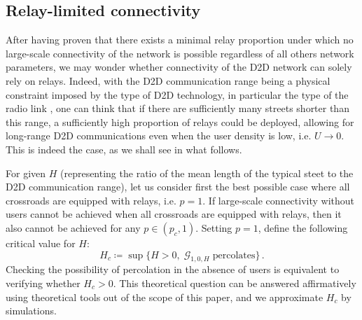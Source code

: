 \documentclass[conference]{IEEEtran}
\begin{document}
\subsection{Relay-limited connectivity}
\label{ss.RelayLimited}
After having proven that there exists a minimal relay proportion under which no large-scale connectivity of the network is possible regardless of all others network parameters, we may wonder whether connectivity of the D2D network can solely rely on relays. Indeed, with  the D2D communication range being a physical constraint imposed by the type of D2D technology, in  particular the type of the radio link \cite{asadi_survey_2014}, one can think  that if there are sufficiently many streets shorter than this range, a sufficiently high proportion of relays could  be deployed, allowing for long-range D2D communications even when the user density is low, i.e. $U \rightarrow 0$. 
This is indeed the case, as we shall see in what follows.

\indent For given $H$ (representing the ratio of the mean length of the typical steet to the D2D communication range), let us consider first  the best possible case where all crossroads are equipped with relays, i.e. $p=1$. If large-scale connectivity without users cannot be achieved when all crossroads are equipped with relays, then it also cannot be achieved for any $p \in (p_c,1)$. Setting $p=1$, define the following critical value for $H$: 
\begin{equation}
    \label{critical-H}
    H_{c}  \coloneqq \sup \lbrace H > 0, \; \mathcal{G}_{1,0,H} \; \text{percolates}\}\,.
\end{equation}
Checking the possibility of percolation in the absence of users is equivalent to 
verifying whether $H_c>0$. This theoretical question can be
answered affirmatively using theoretical tools out of the scope of this paper, and we approximate $H_c$ by simulations.
\end{document}
